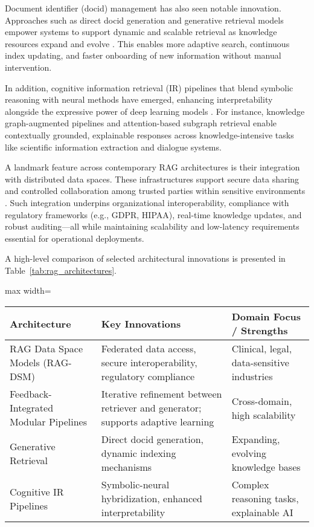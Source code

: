\documentclass[sigconf]{acmart}
\begin{document}
Document identifier (docid) management has also seen notable innovation. Approaches such as direct docid generation and generative retrieval models empower systems to support dynamic and scalable retrieval as knowledge resources expand and evolve \cite{ref45,ref52,ref54}. This enables more adaptive search, continuous index updating, and faster onboarding of new information without manual intervention.

In addition, cognitive information retrieval (IR) pipelines that blend symbolic reasoning with neural methods have emerged, enhancing interpretability alongside the expressive power of deep learning models \cite{ref31,ref37,ref47}. For instance, knowledge graph-augmented pipelines and attention-based subgraph retrieval enable contextually grounded, explainable responses across knowledge-intensive tasks like scientific information extraction and dialogue systems.

A landmark feature across contemporary RAG architectures is their integration with distributed data spaces. These infrastructures support secure data sharing and controlled collaboration among trusted parties within sensitive environments \cite{ref64}. Such integration underpins organizational interoperability, compliance with regulatory frameworks (e.g., GDPR, HIPAA), real-time knowledge updates, and robust auditing—all while maintaining scalability and low-latency requirements essential for operational deployments.

A high-level comparison of selected architectural innovations is presented in Table~\ref{tab:rag_architectures}.

\begin{table*}[htbp]
\centering
\caption{Notable RAG architectural innovations and their domain strengths.}
\label{tab:rag_architectures}
\begin{adjustbox}{max width=\textwidth}
\begin{tabular}{lll}
\toprule
\textbf{Architecture} & \textbf{Key Innovations} & \textbf{Domain Focus / Strengths} \\
\midrule
RAG Data Space Models (RAG-DSM) & Federated data access, secure interoperability, regulatory compliance & Clinical, legal, data-sensitive industries \\
Feedback-Integrated Modular Pipelines & Iterative refinement between retriever and generator; supports adaptive learning & Cross-domain, high scalability \\
Generative Retrieval & Direct docid generation, dynamic indexing mechanisms & Expanding, evolving knowledge bases \\
Cognitive IR Pipelines & Symbolic-neural hybridization, enhanced interpretability & Complex reasoning tasks, explainable AI \\
\bottomrule
\end{tabular}
\end{adjustbox}
\end{table*}
\end{document}
